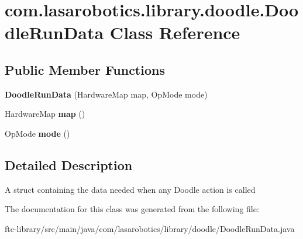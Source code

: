 \hypertarget{classcom_1_1lasarobotics_1_1library_1_1doodle_1_1_doodle_run_data}{}\section{com.\+lasarobotics.\+library.\+doodle.\+Doodle\+Run\+Data Class Reference}
\label{classcom_1_1lasarobotics_1_1library_1_1doodle_1_1_doodle_run_data}
\subsection*{Public Member Functions}
\begin{DoxyCompactItemize}
\item 
\hypertarget{classcom_1_1lasarobotics_1_1library_1_1doodle_1_1_doodle_run_data_a3330230dcf20cd7d5da2b9f1f28012fe}{}{\bfseries Doodle\+Run\+Data} (Hardware\+Map map, Op\+Mode mode)\label{classcom_1_1lasarobotics_1_1library_1_1doodle_1_1_doodle_run_data_a3330230dcf20cd7d5da2b9f1f28012fe}

\item 
\hypertarget{classcom_1_1lasarobotics_1_1library_1_1doodle_1_1_doodle_run_data_a656588b296f480252ef20bf6a9875fb4}{}Hardware\+Map {\bfseries map} ()\label{classcom_1_1lasarobotics_1_1library_1_1doodle_1_1_doodle_run_data_a656588b296f480252ef20bf6a9875fb4}

\item 
\hypertarget{classcom_1_1lasarobotics_1_1library_1_1doodle_1_1_doodle_run_data_a74734d64dffab661dad629b24bd8bd84}{}Op\+Mode {\bfseries mode} ()\label{classcom_1_1lasarobotics_1_1library_1_1doodle_1_1_doodle_run_data_a74734d64dffab661dad629b24bd8bd84}

\end{DoxyCompactItemize}


\subsection{Detailed Description}
A struct containing the data needed when any Doodle action is called 

The documentation for this class was generated from the following file\+:\begin{DoxyCompactItemize}
\item 
ftc-\/library/src/main/java/com/lasarobotics/library/doodle/Doodle\+Run\+Data.\+java\end{DoxyCompactItemize}
